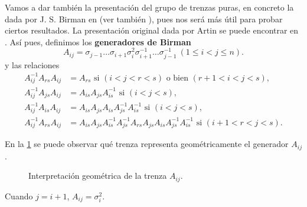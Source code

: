 \documentclass[bibtex, anon]{TEMat-article}
\begin{document}
Vamos a dar también la presentación del grupo de trenzas puras, en concreto la dada por J. S. Birman en \cite{Birman} (ver también \cite{polynomial}), pues nos será más útil para probar ciertos resultados. La presentación original dada por Artin se puede encontrar en \cite{Artin}. Así pues, definimos los \textbf{generadores de Birman}
\begin{equation}\label{birman}
A_{ij}=\sigma_{j-1}\dots\sigma_{i+1}\sigma_i^2\sigma_{i+1}^{-1}\dots\sigma_{j-1}^{-1}\ (1\leq i<j\leq n).
\end{equation}
y las relaciones %
\begin{align*}
A_{ij}^{-1}A_{rs}A_{ij}&=A_{rs}\text{ si } (i<j<r<s)\text{ o bien } (r+1<i<j<s),\\
A_{ij}^{-1}A_{js}A_{ij}&=A_{is}A_{js}A_{is}^{-1} \text{ si } (i<j<s),\\
A_{ij}^{-1}A_{is}A_{ij}&=A_{is}A_{js}A_{is}A_{js}^{-1}A_{is}^{-1}\text{ si } (i<j<s),\\
A_{ij}^{-1}A_{rs}A_{ij}&=A_{is}A_{js}A_{is}^{-1}A_{js}^{-1}A_{rs}A_{js}A_{is}A_{js}^{-1}A_{is}^{-1}\text{ si } (i+1<r<j<s).
\end{align*}

En la \cref{generador} se puede observar qué trenza representa geométricamente el generador $A_{ij}$. 

\begin{figure}[h!]
	\centering
	\caption{Interpretación geométrica de la trenza $A_{ij}$.}\label{generador}
\end{figure}


\begin{nota}
	Cuando $j=i+1$, $A_{ij}=\sigma_i^2$. 
\end{nota}
\end{document}
